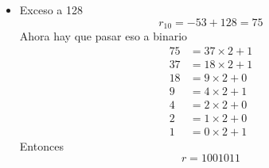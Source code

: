 \documentclass{article}
\begin{document}
\begin{enumerate}
{\begin{itemize}
{                    Complemento a 2\\
                    Como el número es negativo, hay que encontrar su primer 1 
                    desde la derecha e invertir todos los dígitos desde ese 
                    punto para obtener su complemento. Como su primer dígito 
                    desde la derecha es 1, entonces esto es lo mismo que 
                    invertir todos sus dígitos.
                    \[r = 001010\]
                }
                \item {
                    Exceso a 128
                    \[r_{10} = -53 + 128 = 75\]
                    Ahora hay que pasar eso a binario
                    \begin{align*}
                        75 &= 37 \times 2 + 1 \\
                        37 &= 18 \times 2 + 1 \\
                        18 &= 9 \times 2 + 0 \\
                        9 &= 4 \times 2 + 1 \\
                        4 &= 2 \times 2 + 0 \\
                        2 &= 1 \times 2 + 0 \\
                        1 &= 0 \times 2 + 1 
                    \end{align*}
                    Entonces
                    \[r = 1001011\]
                }
            \end{itemize}
        }
    \end{enumerate}
\end{document}
